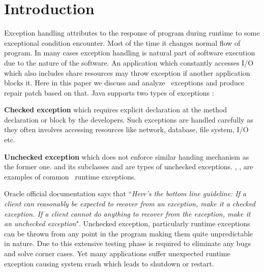 \section{Introduction}
\label{sec:intro}


Exception handling attributes to the response of program during runtime to some
exceptional condition encounter.
Most of the time it changes normal flow of program. In many cases exception
handling is natural part of software execution due to the nature of the
software.
An application which constantly accesses I/O which also includes share resources
may throw exception if another application blocks it.
Here in this paper we discuss and analyze \java\ exceptions and produce repair
patch based on that. Java supports two types of exceptions :
\begin{mylist}
	
\item \textbf{Checked exception} which requires explicit 
declaration at the method declaration or  block by the
developers. Such exceptions are handled carefully as they often involves
accessing resources like network, database, file system, I/O etc.
	
\item \textbf{Unchecked exception} which does not enforce similar handing
mechanism as the former one.  and its
subclasses and  are types of unchecked exceptions.
, ,
 are examples of common \java\ runtime exceptions.

\end{mylist}

Oracle official documentation says that ``\emph{Here's the bottom line
guideline: If a client can reasonably be expected to recover from an exception,
 make it a checked exception. If a client cannot do anything to recover from the
 exception, make it an unchecked exception}".
 Unchecked exception, particularly runtime exceptions can be thrown from any
 point in the program making them quite unpredictable in nature.
 Due to this extensive testing phase is required to eliminate any bugs and solve
 corner cases.
 Yet many applications suffer unexpected runtime exception causing system crash
 which leads to shutdown or restart.

